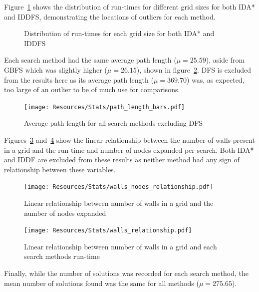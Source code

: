 Figure~\ref{fig:idas_iddfs_runtime_dist} shows the distribution of run-times for different grid sizes for both IDA* and IDDFS, demonstrating the locations of outliers for each method.

\begin{figure}[H]
	\hfill
	\hfill
	\caption{Distribution of run-times for each grid size for both IDA* and IDDFS}
	\label{fig:idas_iddfs_runtime_dist}
\end{figure}

Each search method had the same average path length ($\mu=25.59$), aside from GBFS which was slightly higher ($\mu=26.15$), shown in figure~\ref{fig:path_lengths}. DFS is excluded from the results here as its average path length ($\mu=369.70$) was, as expected, too large of an outlier to be of much use for comparisons.

\begin{figure}[H]
	\centering
	\texttt{[image: Resources/Stats/path\_length\_bars.pdf]}
	\caption{Average path length for all search methods excluding DFS}
	\label{fig:path_lengths}
\end{figure}

Figures~\ref{fig:expanded_walls_relationship} and~\ref{fig:runtime_walls_relationship} show the linear relationship between the number of walls present in a grid and the run-time and number of nodes expanded per search. Both IDA* and IDDF are excluded from these results as neither method had any sign of relationship between these variables.

\begin{figure}[H]
	\centering
	\texttt{[image: Resources/Stats/walls\_nodes\_relationship.pdf]}
	\caption{Linear relationship between number of walls in a grid and the number of nodes expanded}
	\label{fig:expanded_walls_relationship}
\end{figure}

\begin{figure}[H]
	\centering
	\texttt{[image: Resources/Stats/walls\_relationship.pdf]}
	\caption{Linear relationship between number of walls in a grid and each search methods run-time}
	\label{fig:runtime_walls_relationship}
\end{figure}

Finally, while the number of solutions was recorded for each search method, the mean number of solutions found was the same for all methods ($\mu=275.65$).

